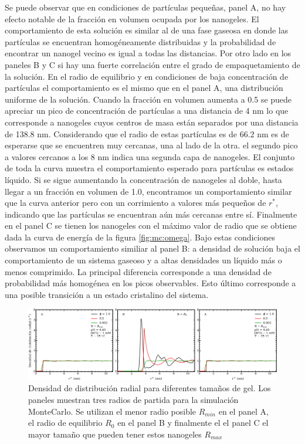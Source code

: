 Se puede observar que en condiciones de part\'iculas peque\~nas, panel A, no hay efecto notable de la fracci\'on en volumen ocupada por los nanogeles. El comportamiento de esta soluci\'on es similar al de una fase gaseosa en donde las part\'iculas se encuentran homog\'eneamente distribuidas y la probabilidad de encontrar un nanogel vecino es igual a todas las distancias.
Por otro lado en los paneles B y C si hay una fuerte correlaci\'on entre el grado de empaquetamiento de la soluci\'on.
En el radio de equilibrio y en condiciones de baja concentraci\'on de part\'iculas el comportamiento es el mismo que en el panel A, una distribuci\'on uniforme de la soluci\'on. Cuando la fracci\'on en volumen aumenta a 0.5 se puede apreciar un pico de concentraci\'on de part\'iculas a una distancia de 4 nm lo que corresponde a nanogeles cuyos centros de masa est\'an separados por una distancia de 138.8 nm. Considerando que el radio de estas part\'iculas es de 66.2 nm es de esperarse que se encuentren muy cercanas, una al lado de la otra. el segundo pico a valores cercanos a los 8 nm indica una segunda capa de nanogeles. El conjunto de toda la curva muestra el comportamiento esperado para part\'iculas es estados l\'iquido. 
Si se sigue aumentando la concentraci\'on de nanogeles al doble, hasta llegar a un fracci\'on en volumen de 1.0, encontramos un comportamiento similar que la curva anterior pero con un corrimiento a valores m\'as peque\~nos de $r^\ast$, indicando que las part\'iculas se encuentran a\'un m\'as cercanas entre s\'i. 
Finalmente en el panel C se tienen los nanogeles con el m\'aximo valor de radio que se obtiene dada la curva de energ\'ia de la figura \ref{fig:mc:omega}. Bajo estas condiciones observamos un comportamiento similiar al panel B: a densidad de soluci\'on baja el comportamiento de un sistema gaseoso y a altas densidades un l\'iquido m\'as o menos comprimido. La principal diferencia corresponde a una densidad de probabilidad m\'as homog\'enea en los picos observables. Esto \'ultimo corresponde a una posible transici\'on a un estado cristalino del sistema.



\begin{figure}[!htb]
	\centering
	\includegraphics[width=1\linewidth]{Figures/graph-mc/rdf-gels.pdf}
	\caption{Densidad de distribuci\'on radial para diferentes tama\~nos de gel. Los paneles muestran tres radios de partida para la simulaci\'on MonteCarlo. Se utilizan el menor radio posible $R_{min}$ en el panel A, el radio de equilibrio $R_0$ en el panel B y finalmente el el panel C el mayor tama\~no que pueden tener estos nanogeles $R_{max}$}
	\label{fig:mc:redf-gels-r}
\end{figure}

